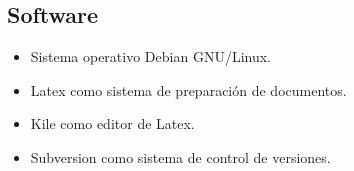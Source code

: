 \subsection{Software}

\begin{itemize}
 \item Sistema operativo Debian GNU/Linux.
 \item Latex como sistema de preparación de documentos.
 \item Kile como editor de Latex.
 \item Subversion como sistema de control de versiones.
\end{itemize}

